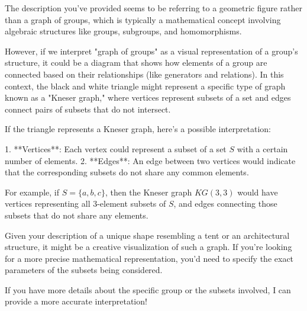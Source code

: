 The description you've provided seems to be referring to a geometric figure rather than a graph of groups, which is typically a mathematical concept involving algebraic structures like groups, subgroups, and homomorphisms.

However, if we interpret "graph of groups" as a visual representation of a group's structure, it could be a diagram that shows how elements of a group are connected based on their relationships (like generators and relations). In this context, the black and white triangle might represent a specific type of graph known as a "Kneser graph," where vertices represent subsets of a set and edges connect pairs of subsets that do not intersect.

If the triangle represents a Kneser graph, here’s a possible interpretation:

1. **Vertices**: Each vertex could represent a subset of a set \( S \) with a certain number of elements.
2. **Edges**: An edge between two vertices would indicate that the corresponding subsets do not share any common elements.

For example, if \( S = \{a, b, c\} \), then the Kneser graph \( KG(3, 3) \) would have vertices representing all 3-element subsets of \( S \), and edges connecting those subsets that do not share any elements.

Given your description of a unique shape resembling a tent or an architectural structure, it might be a creative visualization of such a graph. If you're looking for a more precise mathematical representation, you'd need to specify the exact parameters of the subsets being considered.

If you have more details about the specific group or the subsets involved, I can provide a more accurate interpretation!